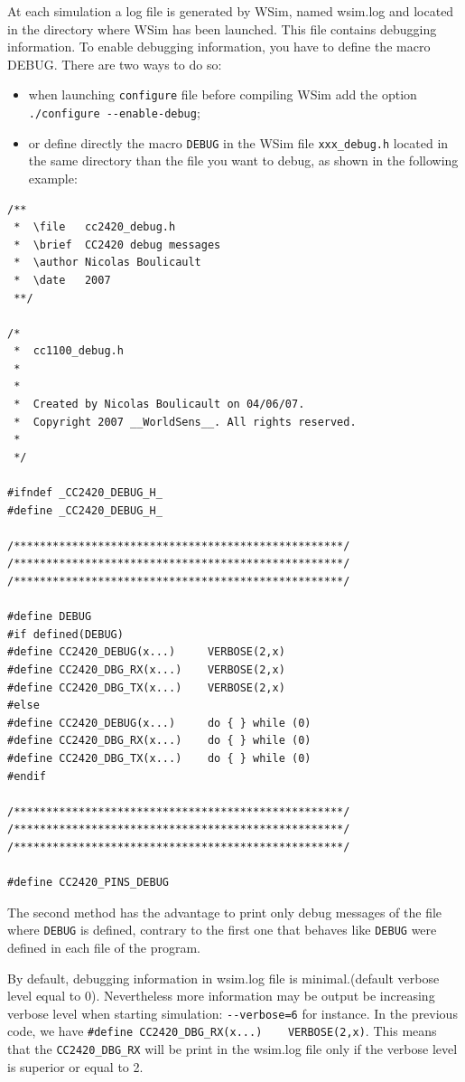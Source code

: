\documentclass[a4paper,10pt]{report}
\begin{document}
At each simulation a log file is generated by WSim, named wsim.log and located in the directory where WSim has been launched. This file contains debugging information.
To enable debugging information, you have to define the macro DEBUG. There are two ways to do so:

\begin{itemize}
  \item when launching \verb$configure$ file before compiling WSim add the option \verb$./configure --enable-debug$;
  \item or define directly the macro \verb$DEBUG$ in the WSim file \verb$xxx_debug.h$ located in the same directory than the file you want to debug, as shown in the following example:
\end{itemize}

\begin{verbatim}
/**
 *  \file   cc2420_debug.h
 *  \brief  CC2420 debug messages 
 *  \author Nicolas Boulicault
 *  \date   2007
 **/

/*
 *  cc1100_debug.h
 *  
 *
 *  Created by Nicolas Boulicault on 04/06/07.
 *  Copyright 2007 __WorldSens__. All rights reserved.
 *
 */

#ifndef _CC2420_DEBUG_H_
#define _CC2420_DEBUG_H_

/***************************************************/
/***************************************************/
/***************************************************/

#define DEBUG
#if defined(DEBUG)
#define CC2420_DEBUG(x...)     VERBOSE(2,x)
#define CC2420_DBG_RX(x...)    VERBOSE(2,x)
#define CC2420_DBG_TX(x...)    VERBOSE(2,x)
#else
#define CC2420_DEBUG(x...)     do { } while (0)
#define CC2420_DBG_RX(x...)    do { } while (0)
#define CC2420_DBG_TX(x...)    do { } while (0)
#endif

/***************************************************/
/***************************************************/
/***************************************************/

#define CC2420_PINS_DEBUG

\end{verbatim}

The second method has the advantage to print only debug messages of the file where \verb$DEBUG$ is defined, contrary to the first one that behaves like \verb$DEBUG$ were defined in each file of the program.

By default, debugging information in wsim.log file is minimal.(default verbose level equal to 0). Nevertheless more information may be output be increasing verbose level when starting simulation: \verb$--verbose=6$ for instance.
In the previous code, we have \verb$#define CC2420_DBG_RX(x...)    VERBOSE(2,x)$. This means that the \verb$CC2420_DBG_RX$ will be print in the wsim.log file only if the verbose level is superior or equal to 2.
\end{document}
